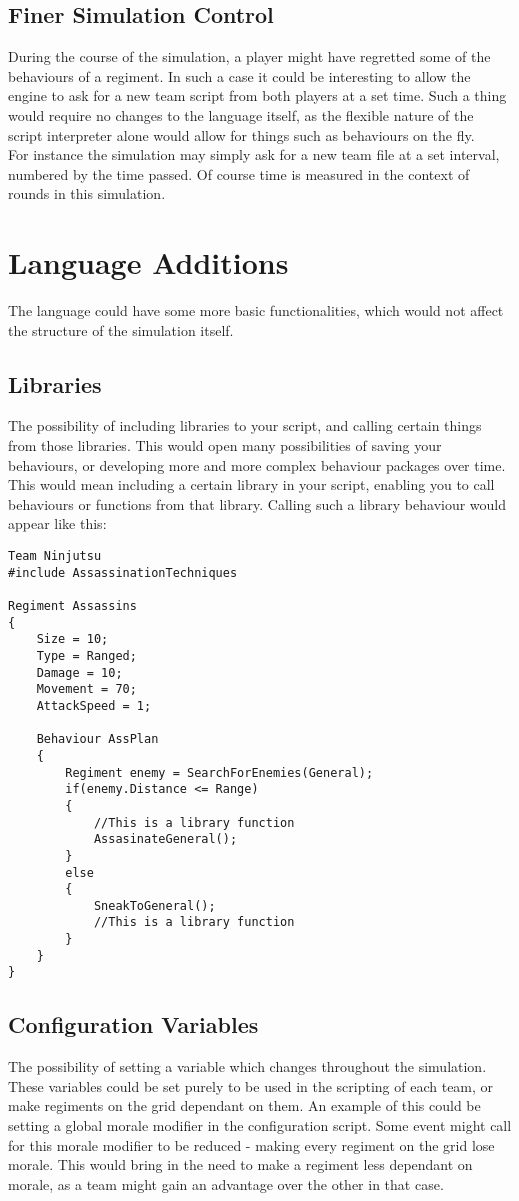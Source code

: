 \subsection{Finer Simulation Control}
During the course of the simulation, a player might have regretted some of the behaviours of a regiment. In such a case it could be interesting to allow the engine to ask for a new team script from both players at a set time. Such a thing would require no changes to the language itself, as the flexible nature of the script interpreter alone would allow for things such as behaviours on the fly. \\
For instance the simulation may simply ask for a new team file at a set interval, numbered by the time passed. Of course time is measured in the context of rounds in this simulation.
\section{Language Additions}
The language could have some more basic functionalities, which would not affect the structure of the simulation itself.
\subsection{Libraries}
The possibility of including libraries to your script, and calling certain things from those libraries. This would open many possibilities of saving your behaviours, or developing more and more complex behaviour packages over time. This would mean including a certain library in your script, enabling you to call behaviours or functions from that library. Calling such a library behaviour would appear like this:

\begin{lstlisting}
Team Ninjutsu
#include AssassinationTechniques

Regiment Assassins
{
	Size = 10;
	Type = Ranged;
	Damage = 10;
	Movement = 70;
	AttackSpeed = 1;
	
	Behaviour AssPlan
	{
		Regiment enemy = SearchForEnemies(General);
		if(enemy.Distance <= Range)
		{
			//This is a library function
			AssasinateGeneral(); 
		}
		else
		{
			SneakToGeneral();
			//This is a library function
		}
	}
}
\end{lstlisting}


\subsection{Configuration Variables}
The possibility of setting a variable which changes throughout the simulation. These variables could be set purely to be used in the scripting of each team, or make regiments on the grid dependant on them.
An example of this could be setting a global morale modifier in the configuration script. Some event might call for this morale modifier to be reduced - making every regiment on the grid lose morale. This would bring in the need to make a regiment less dependant on morale, as a team might gain an advantage over the other in that case.
